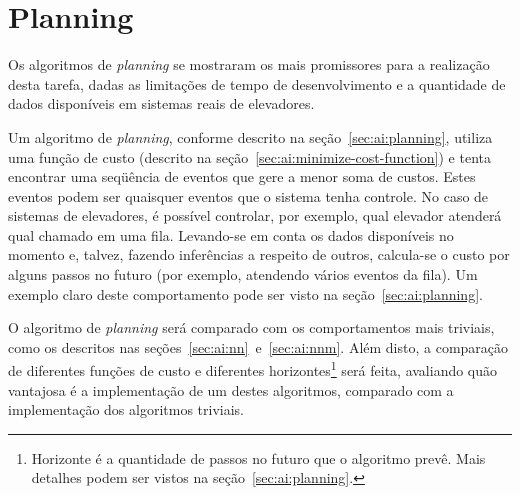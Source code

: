 \section{\label{sec:proposal:planning}Planning}

Os algoritmos de \textit{planning} se mostraram os mais promissores para a
realização desta tarefa, dadas as limitações de tempo de desenvolvimento e a
quantidade de dados disponíveis em sistemas reais de elevadores.

Um algoritmo de \textit{planning}, conforme descrito na
seção~\ref{sec:ai:planning}, utiliza uma função de custo (descrito na
seção~\ref{sec:ai:minimize-cost-function}) e tenta encontrar uma seqüência de
eventos que gere a menor soma de custos. Estes eventos podem ser quaisquer
eventos que o sistema tenha controle. No caso de sistemas de elevadores, é
possível controlar, por exemplo, qual elevador atenderá qual chamado em uma
fila. Levando-se em conta os dados disponíveis no momento e, talvez, fazendo
inferências a respeito de outros, calcula-se o custo por alguns passos no futuro
(por exemplo, atendendo vários eventos da fila). Um exemplo claro deste
comportamento pode ser visto na seção~\ref{sec:ai:planning}.

O algoritmo de \textit{planning} será comparado com os comportamentos mais
triviais, como os descritos nas seções~\ref{sec:ai:nn}~e~\ref{sec:ai:nnm}. Além
disto, a comparação de diferentes funções de custo e diferentes
horizontes\footnote{Horizonte é a quantidade de passos no futuro que o algoritmo
prevê. Mais detalhes podem ser vistos na seção~\ref{sec:ai:planning}.} será
feita, avaliando quão vantajosa é a implementação de um destes algoritmos,
comparado com a implementação dos algoritmos triviais.
